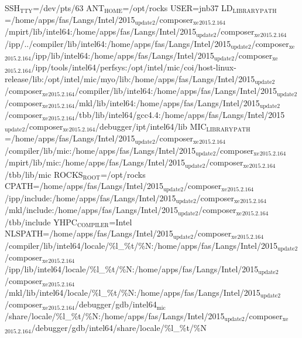 \documentclass[11pt]{article}
\begin{document}
SSH\(_{\text{TTY}}\)=/dev/pts/63
ANT\(_{\text{HOME}}\)=/opt/rocks
USER=jnb37
LD\(_{\text{LIBRARY}}\)\(_{\text{PATH}}\)=/home/apps/fas/Langs/Intel/2015\(_{\text{update2}}\)/composer\(_{\text{xe}}\)\(_{\text{2015.2.164}}\)/mpirt/lib/intel64:/home/apps/fas/Langs/Intel/2015\(_{\text{update2}}\)/composer\(_{\text{xe}}\)\(_{\text{2015.2.164}}\)/ipp/../compiler/lib/intel64:/home/apps/fas/Langs/Intel/2015\(_{\text{update2}}\)/composer\(_{\text{xe}}\)\(_{\text{2015.2.164}}\)/ipp/lib/intel64:/home/apps/fas/Langs/Intel/2015\(_{\text{update2}}\)/composer\(_{\text{xe}}\)\(_{\text{2015.2.164}}\)/ipp/tools/intel64/perfsys:/opt/intel/mic/coi/host-linux-release/lib:/opt/intel/mic/myo/lib:/home/apps/fas/Langs/Intel/2015\(_{\text{update2}}\)/composer\(_{\text{xe}}\)\(_{\text{2015.2.164}}\)/compiler/lib/intel64:/home/apps/fas/Langs/Intel/2015\(_{\text{update2}}\)/composer\(_{\text{xe}}\)\(_{\text{2015.2.164}}\)/mkl/lib/intel64:/home/apps/fas/Langs/Intel/2015\(_{\text{update2}}\)/composer\(_{\text{xe}}\)\(_{\text{2015.2.164}}\)/tbb/lib/intel64/gcc4.4:/home/apps/fas/Langs/Intel/2015\(_{\text{update2}}\)/composer\(_{\text{xe}}\)\(_{\text{2015.2.164}}\)/debugger/ipt/intel64/lib
MIC\(_{\text{LIBRARY}}\)\(_{\text{PATH}}\)=/home/apps/fas/Langs/Intel/2015\(_{\text{update2}}\)/composer\(_{\text{xe}}\)\(_{\text{2015.2.164}}\)/compiler/lib/mic:/home/apps/fas/Langs/Intel/2015\(_{\text{update2}}\)/composer\(_{\text{xe}}\)\(_{\text{2015.2.164}}\)/mpirt/lib/mic:/home/apps/fas/Langs/Intel/2015\(_{\text{update2}}\)/composer\(_{\text{xe}}\)\(_{\text{2015.2.164}}\)/tbb/lib/mic
ROCKS\(_{\text{ROOT}}\)=/opt/rocks
CPATH=/home/apps/fas/Langs/Intel/2015\(_{\text{update2}}\)/composer\(_{\text{xe}}\)\(_{\text{2015.2.164}}\)/ipp/include:/home/apps/fas/Langs/Intel/2015\(_{\text{update2}}\)/composer\(_{\text{xe}}\)\(_{\text{2015.2.164}}\)/mkl/include:/home/apps/fas/Langs/Intel/2015\(_{\text{update2}}\)/composer\(_{\text{xe}}\)\(_{\text{2015.2.164}}\)/tbb/include
YHPC\(_{\text{COMPILER}}\)=Intel
NLSPATH=/home/apps/fas/Langs/Intel/2015\(_{\text{update2}}\)/composer\(_{\text{xe}}\)\(_{\text{2015.2.164}}\)/compiler/lib/intel64/locale/\%l\_\%t/\%N:/home/apps/fas/Langs/Intel/2015\(_{\text{update2}}\)/composer\(_{\text{xe}}\)\(_{\text{2015.2.164}}\)/ipp/lib/intel64/locale/\%l\_\%t/\%N:/home/apps/fas/Langs/Intel/2015\(_{\text{update2}}\)/composer\(_{\text{xe}}\)\(_{\text{2015.2.164}}\)/mkl/lib/intel64/locale/\%l\_\%t/\%N:/home/apps/fas/Langs/Intel/2015\(_{\text{update2}}\)/composer\(_{\text{xe}}\)\(_{\text{2015.2.164}}\)/debugger/gdb/intel64\(_{\text{mic}}\)/share/locale/\%l\_\%t/\%N:/home/apps/fas/Langs/Intel/2015\(_{\text{update2}}\)/composer\(_{\text{xe}}\)\(_{\text{2015.2.164}}\)/debugger/gdb/intel64/share/locale/\%l\_\%t/\%N
\end{document}
